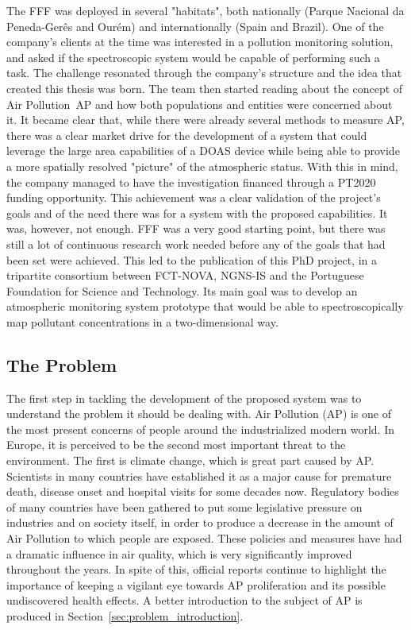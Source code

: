 The \gls{FFF} was deployed in several "habitats", both nationally
(Parque Nacional da Peneda-Gerês and Ourém) and internationally (Spain
and Brazil). One of the company's clients at the time was interested in
a pollution monitoring solution, and asked if the spectroscopic system
would be capable of performing such a task. The challenge resonated
through the company's structure and the idea that created this thesis
was born. The team then started reading about the concept of Air
Pollution~\gls{AP} and how both populations and entities were concerned
about it. It became clear that, while there were already several methods
to measure \gls{AP}, there was a clear market drive for the development
of a system that could leverage the large area capabilities of a
\gls{DOAS} device while being able to provide a more spatially resolved
"picture" of the atmospheric status. With this in mind, the company
managed to have the investigation financed through a PT2020 funding
opportunity. This achievement was a clear validation of the project's
goals and of the need there was for a system with the proposed
capabilities. It was, however, not enough. \gls{FFF} was a very good
starting point, but there was still a lot of continuous research work
needed before any of the goals that had been set were achieved. This led
to the publication of this PhD project, in a tripartite consortium
between FCT-NOVA, NGNS-IS and the Portuguese Foundation for Science and
Technology. Its main goal was to develop an atmospheric monitoring
system prototype that would be able to spectroscopically map pollutant
concentrations in a two-dimensional way.

\subsection{The Problem}%
\label{sub:the_problem}

The first step in tackling the development of the proposed system was to
understand the problem it should be dealing with. Air Pollution
(\gls{AP}) is one of the most present concerns of people around the
industrialized modern world. In Europe, it is perceived to be the second
most important threat to the environment. The first is climate change,
which is great part caused by \gls{AP}. Scientists in many countries
have established it as a major cause for premature death, disease onset
and hospital visits for some decades now. Regulatory bodies of many
countries have been gathered to put some legislative pressure on
industries and on society itself, in order to produce a decrease in the
amount of Air Pollution to which people are exposed. These policies and
measures have had a dramatic influence in air quality, which is very
significantly improved throughout the years. In spite of this, official
reports continue to highlight the importance of keeping a vigilant eye
towards \gls{AP} proliferation and its possible undiscovered health
effects. A better introduction to the subject of \gls{AP} is produced in
Section~\ref{sec:problem_introduction}.

